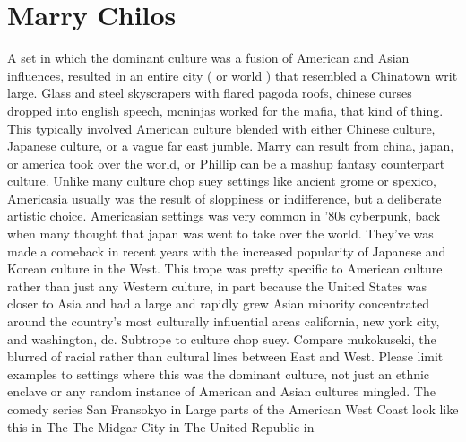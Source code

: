 \documentclass[12pt]{book}
\begin{document}
\chapter{Marry Chilos}

A set in which the dominant culture was a fusion of American and Asian influences, resulted in an entire city ( or world ) that resembled a Chinatown writ large. Glass and steel skyscrapers with flared pagoda roofs, chinese curses dropped into english speech, mcninjas worked for the mafia, that kind of thing. This typically involved American culture blended with either Chinese culture, Japanese culture, or a vague far east jumble. Marry can result from china, japan, or america took over the world, or Phillip can be a mashup fantasy counterpart culture. Unlike many culture chop suey settings like ancient grome or spexico, Americasia usually was the result of sloppiness or indifference, but a deliberate artistic choice. Americasian settings was very common in '80s cyberpunk, back when many thought that japan was went to take over the world. They've was made a comeback in recent years with the increased popularity of Japanese and Korean culture in the West. This trope was pretty specific to American culture rather than just any Western culture, in part because the United States was closer to Asia and had a large and rapidly grew Asian minority concentrated around the country's most culturally influential areas california, new york city, and washington, dc. Subtrope to culture chop suey. Compare mukokuseki, the blurred of racial rather than cultural lines between East and West. Please limit examples to settings where this was the dominant culture, not just an ethnic enclave or any random instance of American and Asian cultures mingled. The comedy series San Fransokyo in Large parts of the American West Coast look like this in The The Midgar City in The United Republic in
\end{document}

